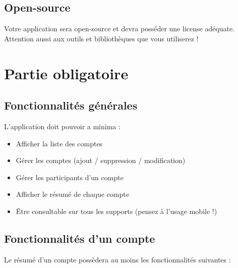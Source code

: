 \documentclass{42-fr}
\begin{document}

	\section{Open-source}
		Votre application sera open-source et devra poss\'eder une license ad\'equate.
		Attention aussi aux outils et bibliothèques que vous utiliserez !



\chapter{Partie obligatoire}


    \section{Fonctionnalit\'es g\'en\'erales}

        L'application doit pouvoir a minima :\\

        \begin{itemize}\itemsep1pt
            \item Afficher la liste des comptes
			\item G\'erer les comptes (ajout / suppression / modification)
            \item G\'erer les participants d'un compte
			\item Afficher le résumé de chaque compte
			\item \^Etre consultable sur tous les supports (pensez à l'usage mobile !)
        \end{itemize}


    \section{Fonctionnalit\'es d'un compte}

        Le résumé d'un compte poss\`edera au moins les fonctionnalités suivantes :\\
\end{document}

